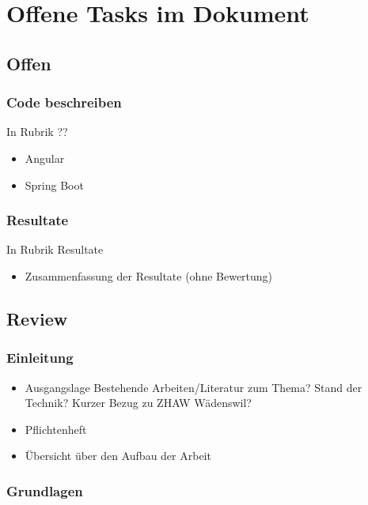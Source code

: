 \documentclass[../main.tex]{subfiles}
\begin{document}
	\section*{Offene Tasks im Dokument}
	\subsection{Offen}
	
	\subsubsection{Code beschreiben}
	In Rubrik ??
	\begin{itemize}
		\item Angular
		\item Spring Boot
	\end{itemize}
	
	\subsubsection{Resultate}
	In Rubrik Resultate
	\begin{itemize}
		\item Zusammenfassung der Resultate (ohne Bewertung)
	\end{itemize}
	
	
	\subsection{Review}
	\subsubsection{Einleitung}
	\begin{itemize}
		\item Ausgangslage
		\subitem Bestehende Arbeiten/Literatur zum Thema?
		\subitem Stand der Technik?
		\subitem Kurzer Bezug zu ZHAW Wädenswil?
		
		\item Pflichtenheft
		\item Übersicht über den Aufbau  der Arbeit
	\end{itemize}
	
	\subsubsection{Grundlagen}
	
\end{document}
